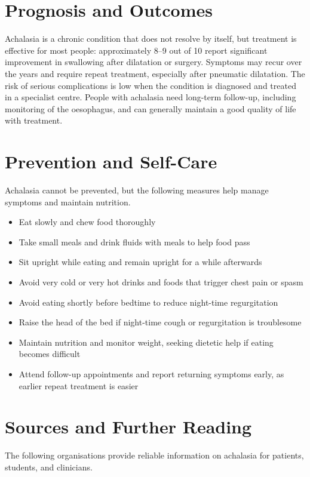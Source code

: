 \section*{Prognosis and Outcomes}
Achalasia is a chronic condition that does not resolve by itself, but treatment is effective for most people: approximately 8--9 out of 10 report significant improvement in swallowing after dilatation or surgery. Symptoms may recur over the years and require repeat treatment, especially after pneumatic dilatation. The risk of serious complications is low when the condition is diagnosed and treated in a specialist centre. People with achalasia need long-term follow-up, including monitoring of the oesophagus, and can generally maintain a good quality of life with treatment.

\section*{Prevention and Self-Care}
Achalasia cannot be prevented, but the following measures help manage symptoms and maintain nutrition.

\begin{itemize}
    \item Eat slowly and chew food thoroughly
    \item Take small meals and drink fluids with meals to help food pass
    \item Sit upright while eating and remain upright for a while afterwards
    \item Avoid very cold or very hot drinks and foods that trigger chest pain or spasm
    \item Avoid eating shortly before bedtime to reduce night-time regurgitation
    \item Raise the head of the bed if night-time cough or regurgitation is troublesome
    \item Maintain nutrition and monitor weight, seeking dietetic help if eating becomes difficult
    \item Attend follow-up appointments and report returning symptoms early, as earlier repeat treatment is easier
\end{itemize}

\section*{Sources and Further Reading}
The following organisations provide reliable information on achalasia for patients, students, and clinicians.

